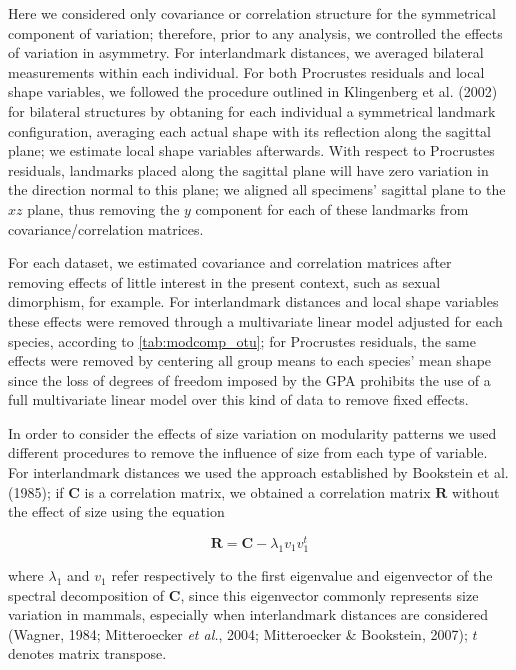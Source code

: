 \documentclass[12pt,twoside]{report}
\begin{document}
Here we considered only covariance or correlation structure for the
symmetrical component of variation; therefore, prior to any analysis, we
controlled the effects of variation in asymmetry. For interlandmark
distances, we averaged bilateral measurements within each individual.
For both Procrustes residuals and local shape variables, we followed the
procedure outlined in Klingenberg et al. (2002) for bilateral structures
by obtaning for each individual a symmetrical landmark configuration,
averaging each actual shape with its reflection along the sagittal
plane; we estimate local shape variables afterwards. With respect to
Procrustes residuals, landmarks placed along the sagittal plane will
have zero variation in the direction normal to this plane; we aligned
all specimens' sagittal plane to the $xz$ plane, thus removing the $y$
component for each of these landmarks from covariance/correlation
matrices.

For each dataset, we estimated covariance and correlation matrices after
removing effects of little interest in the present context, such as
sexual dimorphism, for example. For interlandmark distances and local
shape variables these effects were removed through a multivariate linear
model adjusted for each species, according to \autoref{tab:modcomp_otu};
for Procrustes residuals, the same effects were removed by centering all
group means to each species' mean shape since the loss of degrees of
freedom imposed by the GPA prohibits the use of a full multivariate
linear model over this kind of data to remove fixed effects.

In order to consider the effects of size variation on modularity
patterns we used different procedures to remove the influence of size
from each type of variable. For interlandmark distances we used the
approach established by Bookstein et al. (1985); if $\mathbf{C}$ is a
correlation matrix, we obtained a correlation matrix $\mathbf{R}$
without the effect of size using the equation

\begin{equation}
\mathbf{R} = \mathbf{C} - \lambda_1 v_1 v^{t}_1
\label{eq:iso}
\end{equation}

where $\lambda_1$ and $v_1$ refer respectively to the first eigenvalue
and eigenvector of the spectral decomposition of $\mathbf{C}$, since
this eigenvector commonly represents size variation in mammals,
especially when interlandmark distances are considered (Wagner, 1984;
Mitteroecker \emph{et al.}, 2004; Mitteroecker \& Bookstein, 2007); $t$
denotes matrix transpose.
\end{document}
